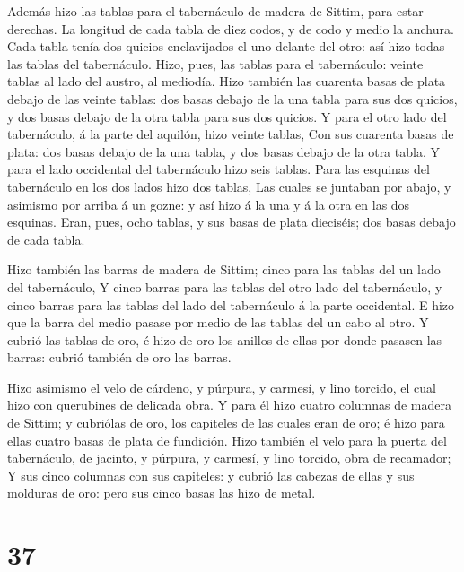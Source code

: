  Además hizo las tablas para el tabernáculo de madera de
Sittim, para estar derechas.  La longitud de cada tabla de
diez codos, y de codo y medio la anchura.  Cada tabla tenía
dos quicios enclavijados el uno delante del otro: así hizo todas las
tablas del tabernáculo.  Hizo, pues, las tablas para el
tabernáculo: veinte tablas al lado del austro, al mediodía.
 Hizo también las cuarenta basas de plata debajo de las
veinte tablas: dos basas debajo de la una tabla para sus dos quicios, y
dos basas debajo de la otra tabla para sus dos quicios.  Y
para el otro lado del tabernáculo, á la parte del aquilón, hizo veinte
tablas,  Con sus cuarenta basas de plata: dos basas debajo
de la una tabla, y dos basas debajo de la otra tabla.  Y
para el lado occidental del tabernáculo hizo seis tablas. 
Para las esquinas del tabernáculo en los dos lados hizo dos tablas,
 Las cuales se juntaban por abajo, y asimismo por arriba á
un gozne: y así hizo á la una y á la otra en las dos esquinas.
 Eran, pues, ocho tablas, y sus basas de plata dieciséis;
dos basas debajo de cada tabla.

 Hizo también las barras de madera de Sittim; cinco para
las tablas del un lado del tabernáculo,  Y cinco barras
para las tablas del otro lado del tabernáculo, y cinco barras para las
tablas del lado del tabernáculo á la parte occidental.  E
hizo que la barra del medio pasase por medio de las tablas del un cabo
al otro.  Y cubrió las tablas de oro, é hizo de oro los
anillos de ellas por donde pasasen las barras: cubrió también de oro las
barras.

 Hizo asimismo el velo de cárdeno, y púrpura, y carmesí, y
lino torcido, el cual hizo con querubines de delicada obra.
 Y para él hizo cuatro columnas de madera de Sittim; y
cubriólas de oro, los capiteles de las cuales eran de oro; é hizo para
ellas cuatro basas de plata de fundición.  Hizo también el
velo para la puerta del tabernáculo, de jacinto, y púrpura, y carmesí, y
lino torcido, obra de recamador;  Y sus cinco columnas con
sus capiteles: y cubrió las cabezas de ellas y sus molduras de oro: pero
sus cinco basas las hizo de metal.

\hypertarget{section-36}{%
\section{37}\label{section-36}}

